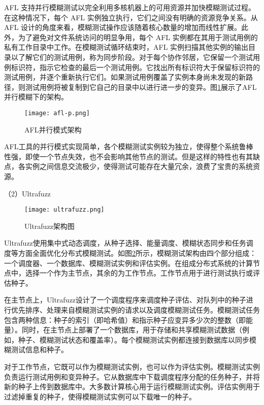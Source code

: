\documentclass[master]{thesis-uestc}
\begin{document}
AFL 支持并行模糊测试以完全利用多核机器上的可用资源并加快模糊测试过程。在这种情况下，每个 AFL 实例独立执行，它们之间没有明确的资源竞争关系。从 AFL 设计的角度来看，模糊测试操作应该随着核心数量的增加而线性扩展。此外，为了避免对文件系统访问的明显争用，每个 AFL 实例都在其用于测试用例的私有工作目录中工作。在模糊测试循环结束时，AFL 实例扫描其他实例的输出目录以了解它们的测试用例，称为同步阶段。对于每个协作邻居，它保留一个测试用例标识符，指示它检查的最后一个测试用例。它找出所有标识符大于保留标识符的测试用例，并逐个重新执行它们。如果测试用例覆盖了实例本身尚未发现的新路径，则测试用例将被复制到它自己的目录中以进行进一步的变异。图\ref{aflp}展示了AFL并行模糊下的架构。

\begin{figure}[!htbp]
    \vspace{6pt}
    \centering
    \texttt{[image: afl-p.png]}
    \caption{AFL并行模式架构}
    \label{aflp}
\end{figure}

AFL工具的并行模式实现简单，各个模糊测试实例较为独立，使得整个系统鲁棒性强，即使一个节点失效，也不会影响其他节点的测试。但是这样的特性也有其缺点，各实例之间信息交流极少，使得测试可能存在大量冗余，浪费了宝贵的系统资源。

（2）Ultrafuzz


\begin{figure}[!htbp]
    \vspace{6pt}
    \centering
    \texttt{[image: ultrafuzz.png]}
    \caption{Ultrafuzz架构图}
    \label{ultrafuzz}
\end{figure}

Ultrafuzz使用集中式动态调度，从种子选择、能量调度、模糊状态同步和任务调度等方面全面优化分布式模糊测试。如图\ref{ultrafuzz}所示，模糊测试架构由四个部分组成：一个调度器、一个数据库、模糊测试实例和评估实例。在组成分布式系统的计算节点中，选择一个作为主节点，其余的为工作节点。工作节点用于进行测试执行或评估种子。

在主节点上，Ultrafuzz设计了一个调度程序来调度种子评估、对队列中的种子进行优先排序、处理来自模糊测试实例的请求以及调度模糊测试任务。模糊测试任务包含两种信息：种子的索引（即哈希值）和指示种子应变异多少次的整数（即能量）。同时，在主节点上部署了一个数据库，用于存储和共享模糊测试数据（例如，种子、模糊测试状态和覆盖率）。每个模糊测试实例都连接到数据库以同步模糊测试信息和种子。

对于工作节点，它既可以作为模糊测试实例，也可以作为评估实例。模糊测试实例负责运行测试用例和变异种子。它从数据库中下载调度程序分配的任务种子，并将新的种子上传到数据库中。大多数计算核心用于运行模糊测试实例。评估实例用于过滤掉重复的种子，使得模糊测试实例可以下载唯一的种子。
\end{document}
